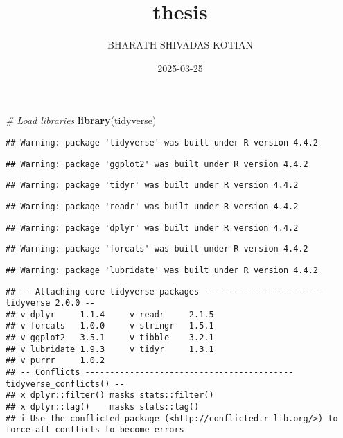 \documentclass[
]{article}
\title{thesis}
\author{BHARATH SHIVADAS KOTIAN}
\date{2025-03-25}
\newenvironment{Shaded}{\begin{snugshade}}{\end{snugshade}}
\newcommand{\CommentTok}[1]{\textcolor[rgb]{0.56,0.35,0.01}{\textit{#1}}}
\newcommand{\FunctionTok}[1]{\textcolor[rgb]{0.13,0.29,0.53}{\textbf{#1}}}
\newcommand{\NormalTok}[1]{#1}
\begin{document}
\maketitle

\begin{Shaded}
\begin{Highlighting}[]
\CommentTok{\# Load libraries}
\FunctionTok{library}\NormalTok{(tidyverse)}
\end{Highlighting}
\end{Shaded}

\begin{verbatim}
## Warning: package 'tidyverse' was built under R version 4.4.2
\end{verbatim}

\begin{verbatim}
## Warning: package 'ggplot2' was built under R version 4.4.2
\end{verbatim}

\begin{verbatim}
## Warning: package 'tidyr' was built under R version 4.4.2
\end{verbatim}

\begin{verbatim}
## Warning: package 'readr' was built under R version 4.4.2
\end{verbatim}

\begin{verbatim}
## Warning: package 'dplyr' was built under R version 4.4.2
\end{verbatim}

\begin{verbatim}
## Warning: package 'forcats' was built under R version 4.4.2
\end{verbatim}

\begin{verbatim}
## Warning: package 'lubridate' was built under R version 4.4.2
\end{verbatim}

\begin{verbatim}
## -- Attaching core tidyverse packages ------------------------ tidyverse 2.0.0 --
## v dplyr     1.1.4     v readr     2.1.5
## v forcats   1.0.0     v stringr   1.5.1
## v ggplot2   3.5.1     v tibble    3.2.1
## v lubridate 1.9.3     v tidyr     1.3.1
## v purrr     1.0.2     
## -- Conflicts ------------------------------------------ tidyverse_conflicts() --
## x dplyr::filter() masks stats::filter()
## x dplyr::lag()    masks stats::lag()
## i Use the conflicted package (<http://conflicted.r-lib.org/>) to force all conflicts to become errors
\end{verbatim}
\end{document}
